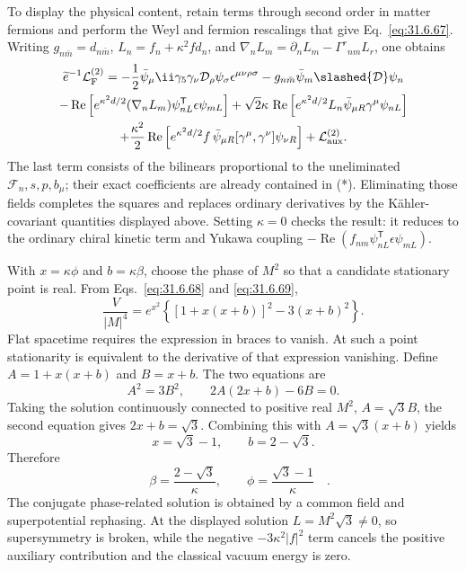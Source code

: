 \begin{enumerate}
  To display the physical content, retain terms through second order in
  matter fermions and perform the Weyl and fermion rescalings that give
  Eq.~\eqref{eq:31.6.67}.  Writing
  \(g_{n\bar m}=d_{n\bar m}\),
  \(L_n=f_n+\kappa^2fd_n\), and
  \(\nabla_nL_m=\partial_nL_m-\Gamma^r{}_{nm}L_r\), one obtains
  \begin{multline}
    \widetilde e^{-1}\mathcal L_{\rm F}^{(2)}
      =-\frac12\bar\psi_\mu \ii\gamma_5\gamma_\nu
        \mathcal D_\rho\psi_\sigma\epsilon^{\mu\nu\rho\sigma}
       -g_{n\bar m}\bar\psi_m\slashed{\mathcal D}\psi_n\\
      -\operatorname{Re}\left[
        e^{\kappa^2d/2}(\nabla_nL_m)
        \psi_{nL}^{\mathsf T}\epsilon\psi_{mL}\right]
      +\sqrt2\kappa\,\operatorname{Re}\left[
        e^{\kappa^2d/2}L_n
        \bar\psi_{\mu R}\gamma^\mu\psi_{nL}\right]\\
      +\frac{\kappa^2}{2}\operatorname{Re}\left[
        e^{\kappa^2d/2}f\,
        \bar\psi_{\mu R}[\gamma^\mu,\gamma^\nu]\psi_{\nu R}\right]
      +\mathcal L_{\rm aux}^{(2)} .
  \end{multline}
  The last term consists of the bilinears proportional to the
  uneliminated \(\mathcal F_n,s,p,b_\mu\); their exact coefficients are
  already contained in (*).  Eliminating those fields completes the
  squares and replaces ordinary derivatives by the Kähler-covariant
  quantities displayed above.  Setting \(\kappa=0\) checks the result:
  it reduces to the ordinary chiral kinetic term and Yukawa coupling
  \(-\operatorname{Re}(f_{nm}\psi_{nL}^{\mathsf T}
  \epsilon\psi_{mL})\).

  With \(x=\kappa\phi\) and \(b=\kappa\beta\), choose the phase of
  \(M^2\) so that a candidate stationary point is real.  From
  Eqs.~\eqref{eq:31.6.68} and \eqref{eq:31.6.69},
  \[
    \frac{V}{|M|^4}
      =e^{x^2}\left\{
        [1+x(x+b)]^2-3(x+b)^2
      \right\}.
  \]
  Flat spacetime requires the expression in braces to vanish.  At such a
  point stationarity is equivalent to the derivative of that expression
  vanishing.  Define
  \(A=1+x(x+b)\) and \(B=x+b\).  The two equations are
  \[
    A^2=3B^2,\qquad
    2A(2x+b)-6B=0.
  \]
  Taking the solution continuously connected to positive real \(M^2\),
  \(A=\sqrt3B\), the second equation gives \(2x+b=\sqrt3\).
  Combining this with \(A=\sqrt3(x+b)\) yields
  \[
    x=\sqrt3-1,\qquad b=2-\sqrt3 .
  \]
  Therefore
  \[
    \boxed{\quad
      \beta=\frac{2-\sqrt3}{\kappa},\qquad
      \phi=\frac{\sqrt3-1}{\kappa}\quad .}
  \]
  The conjugate phase-related solution is obtained by a common field and
  superpotential rephasing.  At the displayed solution
  \(L=M^2\sqrt3\ne0\), so supersymmetry is broken, while the negative
  \(-3\kappa^2|f|^2\) term cancels the positive auxiliary contribution
  and the classical vacuum energy is zero.
\end{enumerate}
